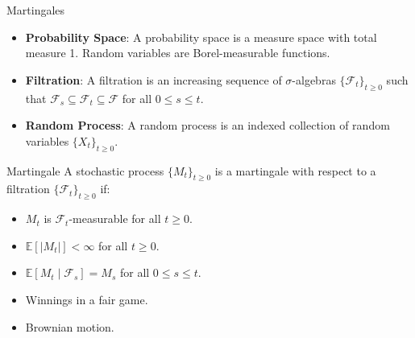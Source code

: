 \documentclass{if-beamer}
\begin{document}
\begin{frame}{Martingales}
    \begin{itemize}
        \item \textbf{Probability Space}: A probability space is a measure space with total measure 1. Random variables are Borel-measurable functions.
        \item \textbf{Filtration}: A filtration is an increasing sequence of $\sigma$-algebras $\{\mathcal{F}_t\}_{t \geq 0}$ such that $\mathcal{F}_s \subseteq \mathcal{F}_t \subseteq \mathcal{F}$ for all $0 \leq s \leq t$.
        \item \textbf{Random Process}: A random process is an indexed collection of random variables $\{X_t\}_{t \geq 0}$.
    \end{itemize}

    \begin{block}{Martingale}
        A stochastic process $\{M_t\}_{t \geq 0}$ is a martingale with respect to a filtration $\{\mathcal{F}_t\}_{t \geq 0}$ if:
        \begin{itemize}
            \item $M_t$ is $\mathcal{F}_t$-measurable for all $t \geq 0$.
            \item $\mathbb{E}[|M_t|] < \infty$ for all $t \geq 0$.
            \item $\mathbb{E}[M_t \mid \mathcal{F}_s] = M_s$ for all $0 \leq s \leq t$.
        \end{itemize}
    \end{block}

    \begin{example}
        \begin{itemize}
            \item Winnings in a fair game.
            \item Brownian motion.
        \end{itemize}
    \end{example}
\end{frame}
\end{document}
